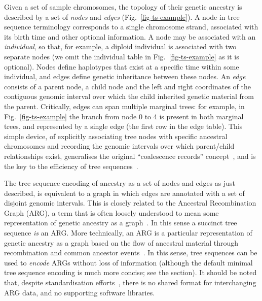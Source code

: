 \documentclass{article}
\begin{document}
Given a set of sample chromosomes, the topology
of their genetic ancestry is described by a set of \emph{nodes}
and \emph{edges} (Fig.~\ref{fig-ts-example}).
A node in tree sequence terminology corresponds
to a single chromosome strand, associated with its birth time
and other optional information. A node may be
associated with an \emph{individual}, so that, for example, a diploid
individual is associated with two separate nodes (we omit
the individual table in Fig.~\ref{fig-ts-example} as it is optional).
Nodes define haplotypes that exist at a specific time within
some individual, and edges define genetic inheritance
between these nodes. An \emph{edge} consists of a
parent node, a child node and the left and right coordinates
of the contiguous genomic interval over which
the child inherited genetic material from the parent.
Critically, edges can span multiple marginal trees: for
example, in Fig.~\ref{fig-ts-example} the branch from node
0 to 4 is present in both marginal trees, and represented
by a single edge (the first row in the edge table).
This simple device, of explicitly associating tree nodes
with specific ancestral chromosomes and recording the
genomic intervals over which parent/child relationships exist,
generalises the original
``coalescence records'' concept~\citep{kelleher2016efficient},
and is the key to the efficiency of tree
sequences~\citep{
kelleher2018efficient,kelleher2019inferring,ralph2020efficiently}.

The tree sequence encoding of ancestry as a set of nodes and edges
as just described, is equivalent to a graph in which edges
are annotated with a set of disjoint genomic intervals.
This is closely related to the Ancestral Recombination Graph (ARG),
a term that is often loosely understood
to mean some representation of genetic
ancestry as a graph~\citep[e.g.][]{mathieson2020ancestry}.
In this sense a succinct tree sequence \emph{is} an ARG.
More technically, an ARG is a particular
representation of genetic ancestry as a graph based on the
flow of ancestral material through recombination and common
ancestor events~\citep{griffiths1991two,griffiths1997ancestral}.
In this sense, tree sequences can be used to \emph{encode}
ARGs without loss of information (although
the default minimal tree sequence encoding is
much more concise; see the  section).
It should be noted that, despite standardisation
efforts~\citep{cardona2008extended,mcgill2013graphml}, there is
no shared format for interchanging ARG data, and no supporting software
libraries.
\end{document}
